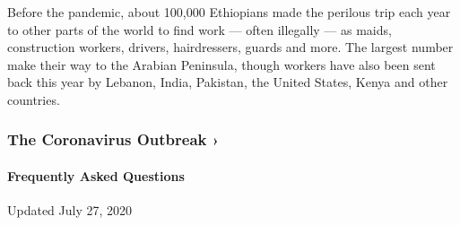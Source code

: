Before the pandemic, about 100,000 Ethiopians made the perilous trip
each year to other parts of the world to find work --- often illegally
--- as maids, construction workers, drivers, hairdressers, guards and
more. The largest number make their way to the Arabian Peninsula, though
workers have also been sent back this year by Lebanon, India, Pakistan,
the United States, Kenya and other countries.

\href{https://www.nytimes3xbfgragh.onion/news-event/coronavirus?action=click\&pgtype=Article\&state=default\&region=MAIN_CONTENT_3\&context=storylines_faq}{}

\hypertarget{the-coronavirus-outbreak-}{%
\subsubsection{The Coronavirus Outbreak
›}\label{the-coronavirus-outbreak-}}

\hypertarget{frequently-asked-questions}{%
\paragraph{Frequently Asked
Questions}\label{frequently-asked-questions}}

Updated July 27, 2020

